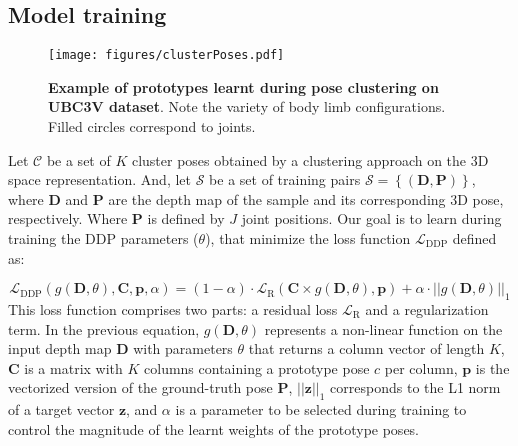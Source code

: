 \documentclass[review,12pt,3p]{elsarticle}
\begin{document}
\subsection{Model training}\label{subsec:DDPtrain}
%
%
\begin{figure*}[b]
\centering
   \texttt{[image: figures/clusterPoses.pdf]}
   \caption{\textbf{Example of prototypes learnt during pose clustering on UBC3V dataset}. Note the variety of body limb configurations. Filled circles correspond to joints.
   }
   \label{fig:clusterPoses}
\end{figure*}
%
Let $\mathcal{C}$ be a set of $K$ cluster poses obtained by a clustering approach on the 3D space representation. And,
let $\mathcal{S}$ be a set of training pairs $\mathcal{S} = \left\{ (\mathbf{D}, \mathbf{P})  \right\}$,
where $\mathbf{D}$ and $\mathbf{P}$ are the depth map of the sample and its corresponding 3D pose, respectively. Where $\mathbf{P}$ is defined by $J$ joint positions. %
Our goal is to learn during training the DDP parameters ($\theta$), that minimize the loss function $\mathcal{L}_{\text{DDP}}$ defined as:




\begin{equation} \label{eq:mtLoss}
    \mathcal{L}_{\text{DDP}}\left( g(\mathbf{D}, \theta), \mathbf{C}, \mathbf{p}, \alpha \right) =
    (1-\alpha) \cdot \mathcal{L}_{\text{R}} \left( \mathbf{C} \times g(\mathbf{D}, \theta) , \mathbf{p} \right)
    + \alpha \cdot ||g(\mathbf{D}, \theta)||_1 
\end{equation}
This loss function comprises two parts: a residual loss $\mathcal{L}_{\text{R}}$ and a regularization term.
In the previous equation, $g(\mathbf{D}, \theta)$  represents a non-linear function on the input depth map $\mathbf{D}$ with parameters $\theta$ that returns a column vector of length $K$, $\mathbf{C}$ is a matrix with $K$ columns containing a prototype pose $c$ per column, $\mathbf{p}$ is the vectorized version of the ground-truth pose $\mathbf{P}$, $||\mathbf{z}||_1$ corresponds to the L1 norm of a target vector $\mathbf{z}$, and $\alpha$ is a  parameter to be selected during training to control the magnitude of the learnt weights of the prototype poses.
\end{document}
